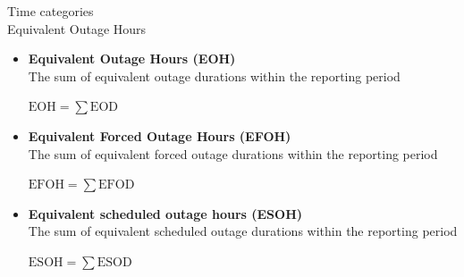 \begin{frame}{Time categories\\Equivalent Outage Hours}
  \begin{itemize}
    \item \textbf{Equivalent Outage Hours (EOH)} \\
    The sum of equivalent outage durations within the reporting period

    {\centering $\displaystyle \mathrm{EOH}=\sum \mathrm{EOD}$ \par}

    \item \textbf{Equivalent Forced Outage Hours (EFOH)} \\
    The sum of equivalent forced outage durations within the reporting period

    {\centering $\displaystyle \mathrm{EFOH}=\sum \mathrm{EFOD}$ \par}

    \item \textbf{Equivalent scheduled outage hours (ESOH)} \\
    The sum of equivalent scheduled outage durations within the reporting period

    {\centering $\displaystyle \mathrm{ESOH}=\sum \mathrm{ESOD}$ \par}


  \end{itemize}
\end{frame}


